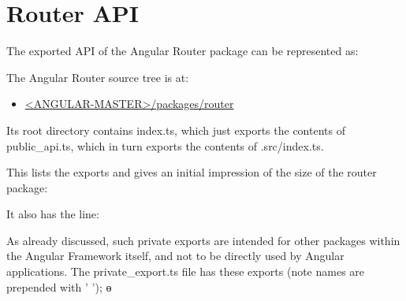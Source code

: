 \section{Router API}

The exported API of the Angular Router package can be represented as:

The Angular Router source tree is at:

\begin{itemize}
  \item \href{https://github.com/angular/angular/tree/master/packages/router}
        {<ANGULAR-MASTER>/packages/router}
\end{itemize}

Its root directory contains index.ts, which just exports the contents of public\_api.ts,
which in turn exports the contents of .src/index.ts.

This lists the exports and gives an initial impression of the size of the router package:



It also has the line:



As already discussed, such private exports are intended for other packages within the
Angular Framework itself, and not to be directly used by Angular applications. The
private\_export.ts file has these exports (note names are prepended with ’ ’);
ɵ


